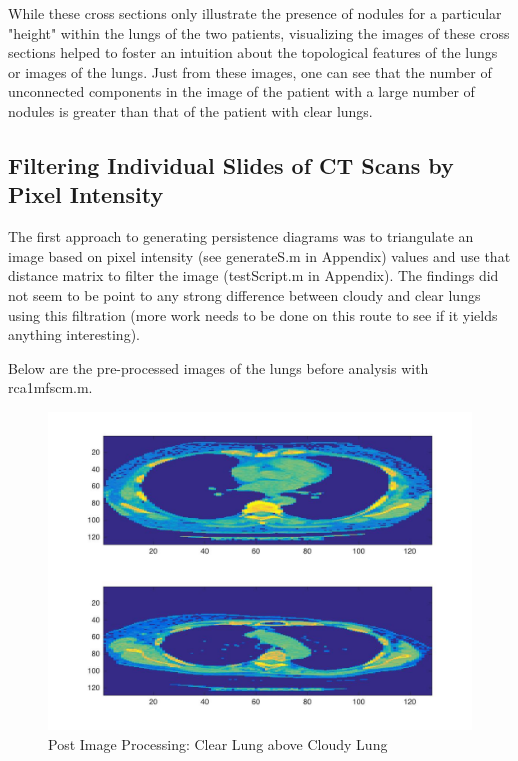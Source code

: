 \documentclass[12pt]{report}
\begin{document}
While these cross sections only illustrate the presence of nodules for a particular "height" within the lungs of the two patients, visualizing the images of these cross sections helped to foster an intuition about the topological features of the lungs or images of the lungs. Just from these images, one can see that the number of unconnected components in the image of the patient with a large number of nodules is greater than that of the patient with clear lungs.

\subsection{Filtering Individual Slides of CT Scans by Pixel Intensity}

The first approach to generating persistence diagrams was to triangulate an image based on pixel intensity (see generateS.m in Appendix) values and use that distance matrix to filter the image (testScript.m in Appendix). The findings did not seem to be point to any strong difference between cloudy and clear lungs using this filtration (more work needs to be done on this route to see if it yields anything interesting).\newline

Below are the pre-processed images of the lungs before analysis with rca1mfscm.m.

\begin{figure}[H]
\centering
	\includegraphics[width=0.8\linewidth]{tSIm.jpg}
	\caption{Post Image Processing: Clear Lung above Cloudy Lung}
\end{figure}
\end{document}
